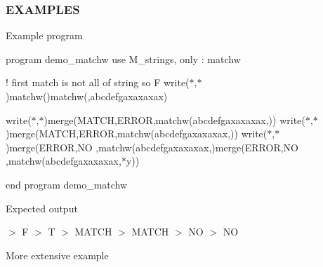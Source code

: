 \subsubsection*{E\+X\+A\+M\+P\+L\+ES}

Example program

program demo\+\_\+matchw use M\+\_\+strings, only \+: matchw

! first match is not all of string so F write($\ast$,$\ast$)matchw()matchw(\textquotesingle{},\textquotesingle{}abcdefgaxaxaxax\textquotesingle{})

write($\ast$,$\ast$)merge(\textquotesingle{}M\+A\+T\+CH\textquotesingle{},\textquotesingle{}E\+R\+R\+OR\textquotesingle{},matchw(\textquotesingle{}abcdefgaxaxaxax\textquotesingle{},\textquotesingle{})) write($\ast$,$\ast$)merge(\textquotesingle{}M\+A\+T\+CH\textquotesingle{},\textquotesingle{}E\+R\+R\+OR\textquotesingle{},matchw(\textquotesingle{}abcdefgaxaxaxax\textquotesingle{},\textquotesingle{})) write($\ast$,$\ast$)merge(\textquotesingle{}E\+R\+R\+OR\textquotesingle{},\textquotesingle{}NO \textquotesingle{},matchw(\textquotesingle{}abcdefgaxaxaxax\textquotesingle{},)merge(\textquotesingle{}E\+R\+R\+OR\textquotesingle{},\textquotesingle{}NO \textquotesingle{},matchw(\textquotesingle{}abcdefgaxaxaxax\textquotesingle{},\textquotesingle{}$\ast$y\textquotesingle{}))

end program demo\+\_\+matchw

Expected output

$>$ F $>$ T $>$ M\+A\+T\+CH $>$ M\+A\+T\+CH $>$ NO $>$ NO

More extensive example

